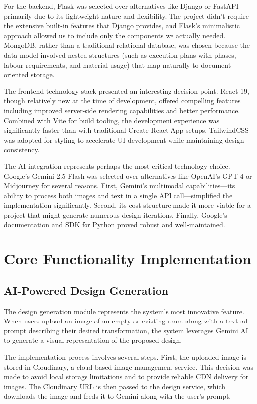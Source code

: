 \documentclass[conference]{IEEEtran}
\begin{document}
For the backend, Flask was selected over alternatives like Django or FastAPI primarily due to its lightweight nature and flexibility. The project didn't require the extensive built-in features that Django provides, and Flask's minimalistic approach allowed us to include only the components we actually needed. MongoDB, rather than a traditional relational database, was chosen because the data model involved nested structures (such as execution plans with phases, labour requirements, and material usage) that map naturally to document-oriented storage.

The frontend technology stack presented an interesting decision point. React 19, though relatively new at the time of development, offered compelling features including improved server-side rendering capabilities and better performance. Combined with Vite for build tooling, the development experience was significantly faster than with traditional Create React App setups. TailwindCSS was adopted for styling to accelerate UI development while maintaining design consistency.

The AI integration represents perhaps the most critical technology choice. Google's Gemini 2.5 Flash was selected over alternatives like OpenAI's GPT-4 or Midjourney for several reasons. First, Gemini's multimodal capabilities—its ability to process both images and text in a single API call—simplified the implementation significantly. Second, its cost structure made it more viable for a project that might generate numerous design iterations. Finally, Google's documentation and SDK for Python proved robust and well-maintained.

\section{Core Functionality Implementation}

\subsection{AI-Powered Design Generation}
The design generation module represents the system's most innovative feature. When users upload an image of an empty or existing room along with a textual prompt describing their desired transformation, the system leverages Gemini AI to generate a visual representation of the proposed design.

The implementation process involves several steps. First, the uploaded image is stored in Cloudinary, a cloud-based image management service. This decision was made to avoid local storage limitations and to provide reliable CDN delivery for images. The Cloudinary URL is then passed to the design service, which downloads the image and feeds it to Gemini along with the user's prompt.
\end{document}
